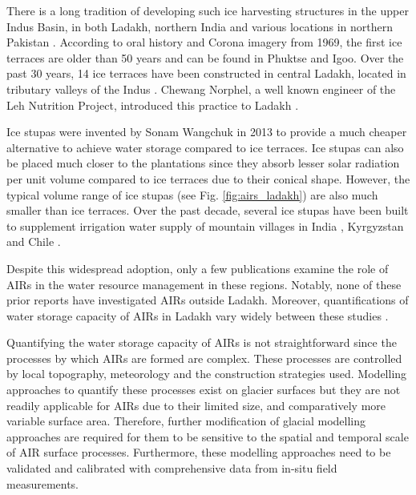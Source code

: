 There is a long tradition of developing such ice harvesting structures in the upper Indus Basin, in both Ladakh,
northern India \citep{labbalTraditionalOasesLadakh2000, nusserIrrigationDevelopmentUpper2012} and various
locations in northern Pakistan \citep{kreutzmannScarcityOpulenceWater2011}. According to oral history and Corona
imagery from 1969, the first ice terraces are older than 50 years and can be found in Phuktse and Igoo. Over the
past 30 years, 14 ice terraces have been constructed in central Ladakh, located in
tributary valleys of the Indus \citep{norphelArtificialGlacierHigh2009,
nusserSociohydrologyArtificialGlaciers2019}. Chewang Norphel, a well known engineer of the Leh Nutrition
Project, introduced this practice to Ladakh \citep{vinceGlacierMan2009}.

Ice stupas were invented by Sonam Wangchuk in 2013 \cite{wangchukIceStupaArtificial2014} to provide a much
cheaper alternative to achieve water storage compared to ice terraces. Ice stupas can also be placed much closer
to the plantations since they absorb lesser solar radiation per unit volume compared to ice terraces due to
their conical shape. However, the typical volume range of ice stupas (see Fig. \ref{fig:airs_ladakh}) are also
much smaller than ice terraces. Over the past decade, several ice stupas have been built to supplement
irrigation water supply of mountain villages in India \citep{wangchukIceStupaCompetition2020,
palmerStoringFrozenWater2022, aggarwalAdaptationClimateChange2021}, Kyrgyzstan
\citep{bbcnewsBrightArtificialGlacier2020} and Chile \citep{reutersConservationistsChileAim2021}.

Despite this widespread adoption, only a few publications examine the role of AIRs in the water resource
management in these regions. Notably, none of these prior reports have investigated AIRs outside Ladakh.
Moreover, quantifications of water storage capacity of AIRs in Ladakh vary widely between these studies
\citep{norphelSnowWaterHarvesting2015, baglaArtificialGlaciersHelp1998}.

Quantifying the water storage capacity of AIRs is not straightforward since the processes by which AIRs are
formed are complex. These processes are controlled by local topography, meteorology and the construction
strategies used. Modelling approaches to quantify these processes exist on glacier surfaces but they are not
readily applicable for AIRs due to their limited size, and comparatively more variable surface area. Therefore,
further modification of glacial modelling approaches are required for them to be sensitive to the spatial and
temporal scale of AIR surface processes. Furthermore, these modelling approaches need to be validated and
calibrated with comprehensive data from in-situ field measurements. 

